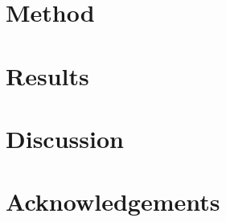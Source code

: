 \documentclass[twocolumn]{aastex631}
\begin{document}
\section{Method}



\section{Results}



\section{Discussion}



\section{Acknowledgements}




\end{document}

